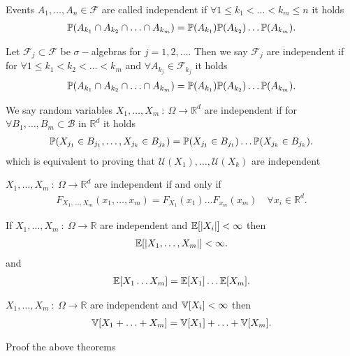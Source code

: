 \begin{definition}
  Events $A_{1},\ldots ,A_{n} \in  \mathcal{F}$ are called independent if $\forall 1 \le k_{1} < \ldots  < k_m \le  n$ it holds 
  \begin{align*}
    \P(A_{k_{1}}\cap A_{k_2} \cap \ldots \cap A_{k_m} )=\P(A_{k_{1}})\P(A_{k_{2}})\ldots \P(A_{k_m})
  .\end{align*}
\end{definition}
\begin{definition}
 Let $\mathcal{F}_j \subset  \mathcal{F}$   be $\sigma-$algebras for $j=1,2,\ldots $. Then we say $\mathcal{F}_j$ are independent if 
 for $\forall 1 \le k_{1}<k_{2}<\ldots <k_m$ and $\forall A_{k_j} \in  \mathcal{F}_{k_j}$ it holds
 \begin{align*}
  \P(A_{k_{1}}\cap A_{k_2} \cap \ldots \cap A_{k_m} )=\P(A_{k_{1}})\P(A_{k_{2}})\ldots \P(A_{k_m})
 .\end{align*}
\end{definition}
\begin{definition}
 We say random variables $X_{1},\ldots ,X_m \ : \ \Omega  \to \mathbb{R}^{d} $  are independent if 
 for $\forall  B_{1},\ldots ,B_{m} \subset  \mathcal{B}$ in $\mathbb{R}^{d} $ it holds 
 \begin{align*}
   \P(X_{j_{1}}\in B_{j_{1}},\ldots, X_{j_k}\in B_{j_k} ) = \P(X_{j_{1}} \in  B_{j_{1}})\ldots \P(X_{j_k} \in  B_{j_k})
 .\end{align*}
 which is equivalent to proving that $\mathcal{U}(X_{1}),\ldots ,\mathcal{U}(X_k)$ are independent
\end{definition}
\begin{theorem}
 $X_{1},\ldots ,X_m \ : \ \Omega  \to \mathbb{R}^{d} $ are independent if and only if 
 \begin{align*}
   F_{X_{1},\ldots ,X_m}(x_{1},\ldots ,x_m) =F_{X_{1}}(x_{1})\ldots F_{x_m}(x_m) \quad \forall  x_i \in \mathbb{R}^{d} 
 .\end{align*}
\end{theorem}

\begin{theorem}
  If $X_{1},\ldots ,X_m \ : \ \Omega  \to \mathbb{R} $ are independent and $\E[\abs{X_i}] < \infty$ then 
  \begin{align*}
    \E[\abs{X_{1},\ldots ,X_m}]<\infty
  .\end{align*}
  and 
  \begin{align*}
    \E[X_{1}\ldots X_m] = \E[X_{1}]\ldots \E[X_m]
  .\end{align*}
\end{theorem}
\begin{theorem}
  $X_{1},\ldots ,X_m \ : \ \Omega  \to \mathbb{R} $ are independent and $\V[X_i] <\infty$ then 
  \begin{align*}
    \V[X_{1} + \ldots  + X_m] = \V[X_{1}] + \ldots  + \V[X_m]
  .\end{align*}
\end{theorem}
\begin{exercise}
 Proof the above theorems
\end{exercise}
